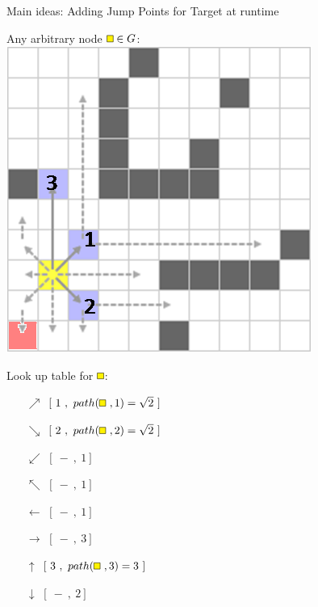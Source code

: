 \documentclass{presentation}
\begin{document}
\begin{frame}{Main ideas: Adding Jump Points for Target at runtime}
 	\begin{minipage}{0.45\textwidth}
		Any arbitrary node $\tikz{\path[draw=black,fill=yellow] (0,0) rectangle (2mm,2mm);}\in G$:\\
		\vspace{3mm}
		\includegraphics[width=\textwidth]{figures/jps_geschnitten/1(yellow2).png}
	\end{minipage}%
	\hfill%
	\begin{minipage}{0.45\textwidth}
		Look up table for $\tikz{\path[draw=black,fill=yellow] (0,0) rectangle (2mm,2mm);}$:\\
		\vspace{3mm}
		\begin{itemize}
		\pause
		\item[$\nearrow$] $[\ 1\ ,\ path(\tikz{\path[draw=black,fill=yellow] (0,0) rectangle (2mm,2mm);}\ ,1)=\sqrt{2}\ ]$
		\item[$\searrow$] $[\ 2\ ,\ path(\tikz{\path[draw=black,fill=yellow] (0,0) rectangle (2mm,2mm);}\ ,2)=\sqrt{2}\ ]$
		\item[$\swarrow$] $[\ -\ ,\ 1]$
		\item[$\nwarrow$] $[\ -\ ,\ 1]$
		\item[$\leftarrow$] $[\ -\ ,\ 1]$
		\item[$\rightarrow$] $[\ -\ ,\ 3]$
		\item[$\uparrow$] $[\ 3\ ,\ path(\tikz{\path[draw=black,fill=yellow] (0,0) rectangle (2mm,2mm);}\ ,3)=3\ ]$
		\item[$\downarrow$] $[\ -\ ,\ 2]$
		\end{itemize}
	\end{minipage}
\end{frame}
\end{document}
